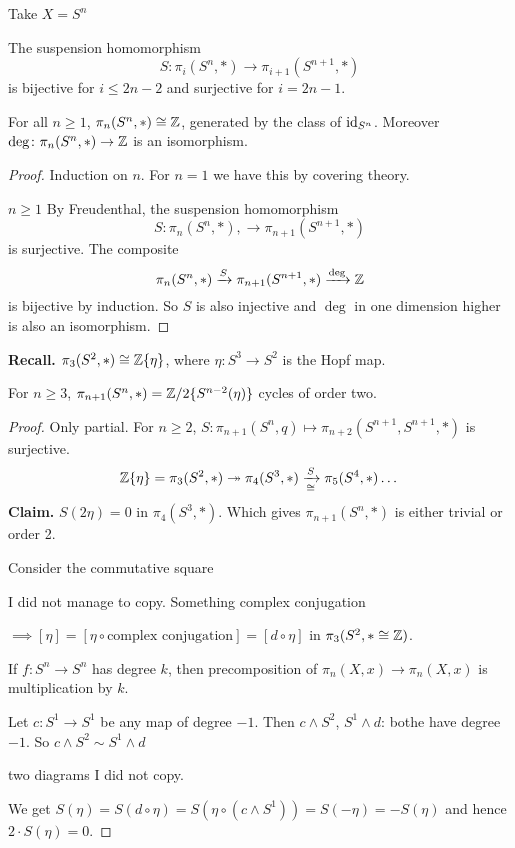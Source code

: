 \documentclass[language=english]{TemplateLecture}
\begin{document}
Take \(X = S^n\)
\begin{corollary}
    The suspension homomorphism
    \[S\colon \pi_i(S^n, *) \to \pi_{i+1}(S^{n+1}, *)\]
    is bijective for \(i \leq 2n-2\) and surjective for \(i = 2n-1\).
\end{corollary}

\begin{corollary}
    For all \(n \geq 1\), \(\pi_n(S^n, *)\cong \mathbb{Z}\), generated by the class of \(\operatorname{id}_{S^n}\). Moreover \(\deg\colon \pi_n(S^n, *)\to \mathbb{Z}\) is an isomorphism.
\end{corollary}

\begin{proof}
    Induction on \(n\). For \(n= 1\) we have this by covering theory.

    \(n\geq 1\) By Freudenthal, the suspension homomorphism
    \[S\colon \pi_n(S^n, *), \to \pi_{n+1}(S^{n+1}, *)\]
    is surjective. The composite
    \[\pi_n(S^n, *) \xrightarrow{S} \pi_{n+1}(S^{n+1}, *) \xrightarrow{\deg} \mathbb{Z}\]
    is bijective by induction. So \(S\) is also injective and \(\deg\) in one dimension higher is also an isomorphism.
\end{proof}

\textbf{Recall.} \(\pi_3(S^2, *) \cong \mathbb{Z}\{\eta\}\), where \(\eta \colon S^3 \to S^2\) is the Hopf map.

\begin{proposition}
    For \(n \geq 3\), \(\pi_{n+1}(S^n, *) = \mathbb{Z}/2\{S^{n-2}(\eta)\}\) cycles of order two.
\end{proposition}

\begin{proof}
    Only partial. For \(n \geq 2\), \(S\colon \pi_{n+1}(S^n, q) \mapsto \pi_{n+2}(S^{n+1}, S^{n+1}, *)\) is surjective.
    \[\mathbb{Z}\{\eta\} = \pi_3(S^2, *) \twoheadrightarrow \pi_4(S^3, *) \xrightarrow[\cong]{S} \pi_5(S^4, *)\dots\]
    \textbf{Claim.} \(S(2\eta) = 0\) in \(\pi_4(S^3, *)\). Which gives \(\pi_{n+1}(S^n, *)\) is either trivial or order 2.

    Consider the commutative square

    I did not manage to copy. Something complex conjugation

    \(\implies [\eta] = [\eta \circ \text{complex conjugation}] = [d \circ \eta]\) in \(\pi_3(S^2, * \cong \mathbb{Z})\).

    If \(f\colon S^n \to S^n\) has degree \(k\), then precomposition of \(\pi_n(X,x)\to \pi_n(X,x)\) is multiplication by \(k\).

    Let \(c\colon S^1\to S^1\) be any map of degree \(-1\). Then \(c\wedge S^2\), \(S^1 \wedge d\): bothe have degree \(-1\). So \(c \wedge S^2 \sim S^1 \wedge d\)

    two diagrams I did not copy.

    We get \(S(\eta) = S(d \circ \eta)=S(\eta \circ (c\wedge S^1)) = S(-\eta) = - S(\eta)\) and hence \(2 \cdot S(\eta) = 0\).
\end{proof}
\end{document}
